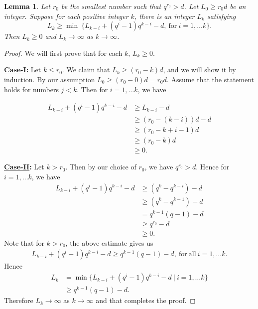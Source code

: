 \documentclass{amsart}
\newtheorem {lemma}[theorem] {\bf Lemma}
\numberwithin {equation}{section}
\begin{document}
\cblue
\begin{lemma}\label{esti} Let $r_{0}$ be the smallest number such that $q^{r_{0}}>d$. Let $L_{0}\geq r_{0}d$ be an integer. Suppose for each positive integer $k$,  there is an integer  $L_{k}$ satisfying $$L_{k}\geq \min~\{L_{k-i}+(q^{i}-1)q^{k-i}-d, ~\mathrm{for}~i=1,\ldots k\}.$$ Then $L_{k}\geq 0$ and $L_{k}\rightarrow \infty$ as $k\rightarrow \infty$.   
\end{lemma}\color{black}
\begin{proof}
We will first prove that for each $k$, $L_{k}\geq 0$.

\noindent \textbf{\underline{Case-I}:} Let $k\leq r_{0}$. We claim that $L_{k}\geq (r_{0}-k)d$, and we will show it by induction. By our assumption $L_{0}\geq (r_{0}-0)d=r_{0}d$. Assume that the statement holds for numbers $j<k$. Then for $i=1,\ldots k$, we have 

\begin{align*}
L_{k-i}+(q^{i}-1)q^{k-i}-d &\geq L_{k-i}-d\\
&\geq (r_{0}-(k-i))d-d\\
&\geq (r_{0}-k+i-1)d\\
&\geq (r_{0}-k)d\\
&\geq 0.
\end{align*}
  
\noindent\textbf{\underline{Case-II}:} Let $k> r_{0}$. Then by our choice of $r_{0}$, we have $q^{r_{0}}>d$. Hence for $i=1,\ldots k$, we have 
\begin{align*}
L_{k-i}+(q^{i}-1)q^{k-i}-d&\geq (q^{k}-q^{k-i})-d\\
&\geq (q^{k}-q^{k-1})-d\\
&= q^{k-1}(q-1)-d\\
&\geq q^{r_{0}}-d\\
&\geq  0.
\end{align*}
Note that for $k>r_{0}$, the above estimate gives us
\begin{align*}
L_{k-i}+(q^{i}-1)q^{k-i}-d\geq q^{k-1}(q-1)-d,~ \mathrm{for~ all}~ i=1,\ldots k.
\end{align*}
Hence 
\begin{align*}
L_{k}&=\min \{L_{k-i}+(q^{i}-1)q^{k-i}-d ~|~ i=1,\ldots k\}\\
&\geq q^{k-1}(q-1)-d.
\end{align*}
Therefore $L_{k}\rightarrow \infty$ as $k\rightarrow \infty$ and that completes the proof.
\end{proof}
\end{document}
